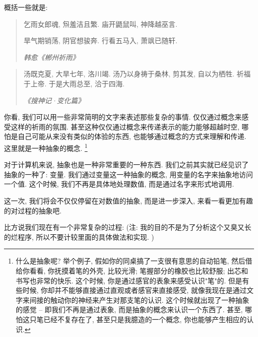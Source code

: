 概括一些就是: 

\begin{quotation}
  乞雨女郎魂, 炰羞洁且繁. 庙开鼯鼠叫, 神降越巫言. 

  旱气期销荡, 阴官想骏奔. 行看五马入, 萧飒已随轩. 

  \emph{韩愈《郴州祈雨》}
\end{quotation}

\begin{quotation}
  汤既克夏, 大旱七年, 洛川竭. 汤乃以身祷于桑林, 剪其发, 自以为栖牲. 祈福于上帝. 于是大雨总至, 洽于四海. 

  \emph{《搜神记·变化篇》}
\end{quotation}

你看, 我们可以用一些非常简明的文字来表述那些复杂的事情. 仅仅通过概念来感受这样的祈雨的氛围. 甚至这种仅仅通过概念来传递表示的能力能够超越时空, 哪怕是自己可能从来没有类似的体验的东西, 也能够通过概念的方式来理解和传递. 这里就是一种抽象的概念. \footnote{什么是抽象呢? 举个例子, 假如你的同桌搞了一支很有意思的自动铅笔, 然后借给你看看, 你抚摸着笔的外壳, 比较光滑; 笔握部分的橡胶也比较舒服; 出芯和书写也非常的快乐. 这个时候, 你是通过感官的表象来感受认识"笔"的. 但是有些时候, 你却并不能够直接通过直观或者感官来直接感受, 就像我现在是通过文字来间接的触动你的神经来产生对那支笔的认识. 这个时候就出现了一种抽象的感觉 -- 即我们不再是通过表象, 而是抽象的概念来认识一个东西了. 甚至, 哪怕这只笔已经不复存在了, 甚至只是我臆造的一个概念, 你也能够产生相应的认识. }

对于计算机来说, 抽象也是一种非常重要的一种东西. 我们之前其实就已经见识了抽象的一种了: 变量. 我们通过变量这一种抽象的概念, 用变量的名字来抽象地访问一个值. 这个时候, 我们不再是具体地处理数值, 而是通过名字来形式地调用. 

这一次, 我们将会不仅仅停留在对数值的抽象, 而是进一步深入, 来看一看更加有趣的对过程的抽象吧. 

比方说我们现在有一个非常复杂的过程: (注: 我的目的不是为了分析这个又臭又长的烂程序, 所以不要计较里面的具体做法和实现. )

